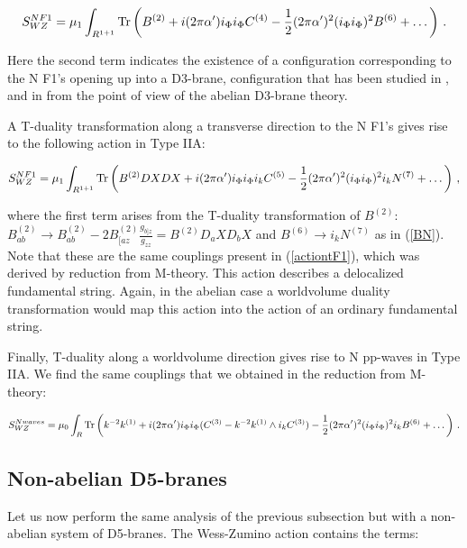 \documentclass[12pt,a4paper]{article}
\begin{document}
\begin{equation}
S^{N F1}_{WZ}=\mu_1\int_{R^{1+1}}{\rm Tr}
\left(B^{(2)}+i(2\pi\alpha^\prime)i_\Phi i_\Phi C^{(4)}
-\frac12 (2\pi\alpha^\prime)^2 (i_\Phi i_\Phi)^2 B^{(6)}
+\dots\right)\, .
\end{equation}

\noindent Here the second term indicates the existence of a configuration
corresponding to the N F1's opening up into a D3-brane,
configuration that has been studied in \cite{CMT}, and in \cite{Hasi}
from the point of view of the abelian D3-brane theory.

A T-duality transformation along a transverse direction to the N F1's
gives rise to the following action in Type IIA:

\begin{equation}
S^{N F1}_{WZ}=\mu_1\int_{R^{1+1}}{\rm Tr}
\left(B^{(2)}DXDX+i(2\pi\alpha^\prime)i_\Phi i_\Phi 
i_k C^{(5)}-\frac12 (2\pi\alpha^\prime)^2 (i_\Phi i_\Phi)^2 i_k N^{(7)}
+\dots\right)\, ,
\end{equation}

\noindent where the first term arises from the T-duality transformation
of $B^{(2)}$: $B^{(2)}_{ab}\rightarrow 
B^{(2)}_{ab}-2 B^{(2)}_{[a z}\frac{g_{b]z}}{g_{zz}}=
B^{(2)}D_aXD_bX$ and $B^{(6)}\rightarrow 
i_k N^{(7)}$ as in (\ref{BN}).
Note that these are
the same couplings present in (\ref{actiontF1}),
which was derived by reduction from M-theory. 
This action describes a delocalized fundamental string.
Again, in the abelian case a worldvolume duality transformation would
map this action into the action of an ordinary fundamental string.

Finally, T-duality along a worldvolume direction gives rise to N
pp-waves in Type IIA. We find the same couplings that we obtained in
the reduction from M-theory:

\begin{equation}
S^{N waves}_{WZ}=\mu_0\int_R {\rm Tr}\left(k^{-2}k^{(1)}+i
(2\pi\alpha^\prime)i_\Phi i_\Phi (C^{(3)}-k^{-2}k^{(1)}\wedge
i_k C^{(3)})-\frac12 (2\pi\alpha^\prime)^2 (i_\Phi i_\Phi)^2
i_k B^{(6)}+\dots\right)\, .
\end{equation}


\subsection{Non-abelian D5-branes}

Let us now perform the same analysis of the previous subsection 
but with a non-abelian system of D5-branes. The Wess-Zumino
action contains the terms:
\end{document}
